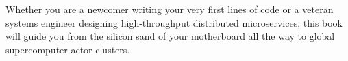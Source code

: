 \documentclass[11pt,a4paper,oneside]{book}
\begin{document}
Whether you are a newcomer writing your very first lines of code or a veteran systems engineer designing high-throughput distributed microservices, this book will guide you from the silicon sand of your motherboard all the way to global supercomputer actor clusters.

\tableofcontents

\mainmatter

















\end{document}

